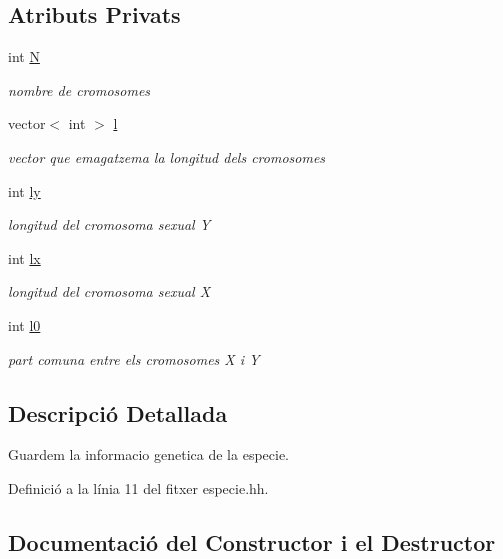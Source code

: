 \subsection*{Atributs Privats}
\begin{DoxyCompactItemize}
\item 
int \hyperlink{classespecie_a3333db40d4af2c0073d50afea08e0296}{N}
\begin{DoxyCompactList}\small\item\em nombre de cromosomes \end{DoxyCompactList}\item 
vector$<$ int $>$ \hyperlink{classespecie_a754d7eefb82d1ebe3f573cff16dd43ee}{l}
\begin{DoxyCompactList}\small\item\em vector que emagatzema la longitud dels cromosomes \end{DoxyCompactList}\item 
int \hyperlink{classespecie_ad6993a4730779e367c432cce91780895}{ly}
\begin{DoxyCompactList}\small\item\em longitud del cromosoma sexual Y \end{DoxyCompactList}\item 
int \hyperlink{classespecie_af620813fbc24dd91e5a25d38b5847bf8}{lx}
\begin{DoxyCompactList}\small\item\em longitud del cromosoma sexual X \end{DoxyCompactList}\item 
int \hyperlink{classespecie_a7e4448f0f61a573753aa7000ad073982}{l0}
\begin{DoxyCompactList}\small\item\em part comuna entre els cromosomes X i Y \end{DoxyCompactList}\end{DoxyCompactItemize}


\subsection{Descripció Detallada}
Guardem la informacio genetica de la especie. 

Definició a la línia 11 del fitxer especie.\+hh.



\subsection{Documentació del Constructor i el Destructor}
